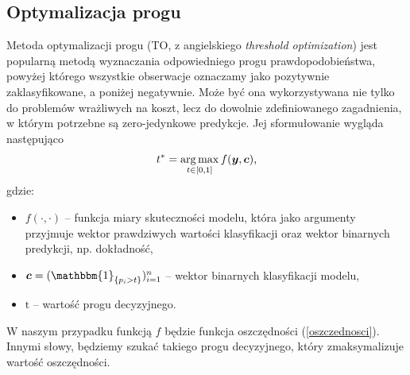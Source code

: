 \documentclass[inzynierska]{pwr_wmat_praca_dyplomowa}
\theoremstyle{plain}
\numberwithin{theorem}{chapter}
\theoremstyle{definition}
\numberwithin{theorem}{chapter}
\DeclareMathOperator*{\argmax}{arg\,max}
\begin{document}
\subsection{Optymalizacja progu}
Metoda optymalizacji progu (TO, z angielskiego \textit{threshold optimization}) jest popularną metodą wyznaczania odpowiedniego progu prawdopodobieństwa, powyżej którego wszystkie obserwacje oznaczamy jako pozytywnie zaklasyfikowane, a poniżej negatywnie. Może być ona wykorzystywana nie tylko do problemów wrażliwych na koszt, lecz do dowolnie zdefiniowanego zagadnienia, w którym potrzebne są zero-jedynkowe predykcje. Jej sformułowanie wygląda następująco
$$ t^{*} = \argmax_{t \in [0,1]} f(\ytrue, \boldsymbol{c}) \text{,} $$
gdzie:
\begin{itemize}
	\item $f(\cdot, \cdot) $ -- funkcja miary skuteczności modelu, która jako argumenty przyjmuje wektor prawdziwych wartości klasyfikacji oraz wektor binarnych predykcji, np. dokładność,
	\item $\boldsymbol{c} = (\mathbbm{1}_{\{p_i > t\}})_{i=1}^n $ -- wektor binarnych klasyfikacji modelu,
	\item $ \text{t} $ -- wartość progu decyzyjnego.
\end{itemize}{}
W naszym przypadku funkcją $f$ będzie funkcja oszczędności (\ref{oszczednosci}). Innymi słowy, będziemy szukać takiego progu decyzyjnego, który zmaksymalizuje wartość oszczędności.
\end{document}
